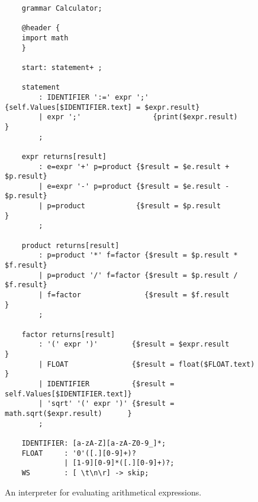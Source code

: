 \begin{figure}[!ht]
\centering
\begin{verbatim}
    grammar Calculator;
    
    @header {
    import math
    }
    
    start: statement+ ; 
    
    statement
        : IDENTIFIER ':=' expr ';' {self.Values[$IDENTIFIER.text] = $expr.result}
        | expr ';'                 {print($expr.result)                         }
        ;
    
    expr returns[result]
        : e=expr '+' p=product {$result = $e.result + $p.result}
        | e=expr '-' p=product {$result = $e.result - $p.result}
        | p=product            {$result = $p.result            }
        ;
    
    product returns[result]
        : p=product '*' f=factor {$result = $p.result * $f.result}
        | p=product '/' f=factor {$result = $p.result / $f.result}
        | f=factor               {$result = $f.result            }
        ;
    
    factor returns[result]
        : '(' expr ')'        {$result = $expr.result                 }
        | FLOAT               {$result = float($FLOAT.text)           }
        | IDENTIFIER          {$result = self.Values[$IDENTIFIER.text]}
        | 'sqrt' '(' expr ')' {$result = math.sqrt($expr.result)      }
        ;
    
    IDENTIFIER: [a-zA-Z][a-zA-Z0-9_]*;
    FLOAT     : '0'([.][0-9]+)?
              | [1-9][0-9]*([.][0-9]+)?;
    WS        : [ \t\n\r] -> skip; 
\end{verbatim}
\vspace*{-0.3cm}
\caption{An interpreter for evaluating arithmetical expressions.}
\label{fig:Calculator.g4}
\end{figure}

